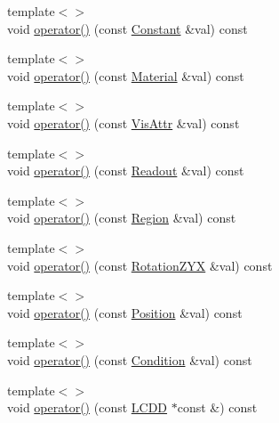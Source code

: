 \begin{DoxyCompactItemize}
{\footnotesize template$<$$>$ }\\void \hyperlink{struct_d_d4hep_1_1_printer_ab21c1ad2868521a1cbd2e3f301b0db90}{operator()} (const \hyperlink{class_d_d4hep_1_1_geometry_1_1_constant}{Constant} \&val) const
\item 
{\footnotesize template$<$$>$ }\\void \hyperlink{struct_d_d4hep_1_1_printer_a7bd57999b2889ea04620f0619bfda983}{operator()} (const \hyperlink{class_d_d4hep_1_1_geometry_1_1_material}{Material} \&val) const
\item 
{\footnotesize template$<$$>$ }\\void \hyperlink{struct_d_d4hep_1_1_printer_a92db1cf77b2f6435c8089870281ac935}{operator()} (const \hyperlink{class_d_d4hep_1_1_geometry_1_1_vis_attr}{Vis\+Attr} \&val) const
\item 
{\footnotesize template$<$$>$ }\\void \hyperlink{struct_d_d4hep_1_1_printer_ae454d20fdece1287a5999d338476f043}{operator()} (const \hyperlink{class_d_d4hep_1_1_geometry_1_1_readout}{Readout} \&val) const
\item 
{\footnotesize template$<$$>$ }\\void \hyperlink{struct_d_d4hep_1_1_printer_aae536ffe33e3c2e7b51985dbd93e8226}{operator()} (const \hyperlink{class_d_d4hep_1_1_geometry_1_1_region}{Region} \&val) const
\item 
{\footnotesize template$<$$>$ }\\void \hyperlink{struct_d_d4hep_1_1_printer_a4a0c3d28367b9d06e9117ba1261e8bf1}{operator()} (const \hyperlink{namespace_d_d4hep_1_1_geometry_a24667b2b9c3cec3d5239828db4d52189}{Rotation\+Z\+YX} \&val) const
\item 
{\footnotesize template$<$$>$ }\\void \hyperlink{struct_d_d4hep_1_1_printer_afe6264c0121d56d3a2a581883a377c9c}{operator()} (const \hyperlink{namespace_d_d4hep_1_1_geometry_a55083902099d03506c6db01b80404900}{Position} \&val) const
\item 
{\footnotesize template$<$$>$ }\\void \hyperlink{struct_d_d4hep_1_1_printer_a353b9c794a611d154e26875467f3c260}{operator()} (const \hyperlink{class_d_d4hep_1_1_conditions_1_1_condition}{Condition} \&val) const
\item 
{\footnotesize template$<$$>$ }\\void \hyperlink{struct_d_d4hep_1_1_printer_acee5e080faf761fb4c3ee6faccb0d96e}{operator()} (const \hyperlink{class_d_d4hep_1_1_geometry_1_1_l_c_d_d}{L\+C\+DD} $\ast$const \&) const
\end{DoxyCompactItemize}
